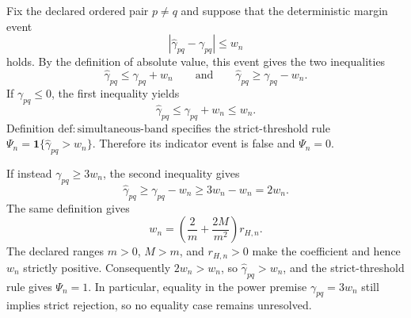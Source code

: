 Fix the declared ordered pair \(p\ne q\) and suppose that the deterministic margin event
\[
 \left\lvert\widehat\gamma_{pq}-\gamma_{pq}\right\rvert\le w_n
\]
holds. By the definition of absolute value, this event gives the two inequalities
\[
 \widehat\gamma_{pq}\le \gamma_{pq}+w_n
 \qquad\text{and}\qquad
 \widehat\gamma_{pq}\ge \gamma_{pq}-w_n.
\]
If \(\gamma_{pq}\le0\), the first inequality yields
\[
 \widehat\gamma_{pq}\le \gamma_{pq}+w_n\le w_n.
\]
Definition \(\mathrm{def:simultaneous\text{-}band}\) specifies the strict-threshold rule
\(\Psi_n=\mathbf 1\{\widehat\gamma_{pq}>w_n\}\). Therefore its indicator event is false and \(\Psi_n=0\).

If instead \(\gamma_{pq}\ge3w_n\), the second inequality gives
\[
 \widehat\gamma_{pq}
 \ge \gamma_{pq}-w_n
 \ge 3w_n-w_n
 =2w_n.
\]
The same definition gives
\[
 w_n=\left(\frac{2}{m}+\frac{2M}{m^2}\right)r_{H,n}.
\]
The declared ranges \(m>0\), \(M>m\), and \(r_{H,n}>0\) make the coefficient and hence \(w_n\) strictly positive. Consequently \(2w_n>w_n\), so \(\widehat\gamma_{pq}>w_n\), and the strict-threshold rule gives \(\Psi_n=1\). In particular, equality in the power premise \(\gamma_{pq}=3w_n\) still implies strict rejection, so no equality case remains unresolved.

